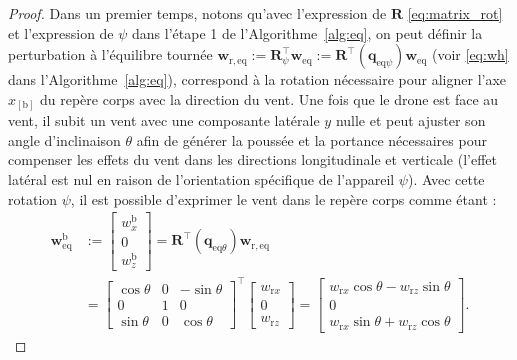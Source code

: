     \begin{proof}
        Dans un premier temps, notons qu'avec l'expression de $\boldsymbol{R}$ \eqref{eq:matrix_rot} et l'expression de  $\psi$ dans l'étape 1 de l'Algorithme~\ref{alg:eq}, on peut définir la perturbation à l'équilibre tournée $\boldsymbol{w}_{\mathrm{r,eq}} := \boldsymbol{R}^\top_{\psi} \boldsymbol{w}_{\mathrm{eq}} :=    \boldsymbol{R}^\top(\boldsymbol{q}_{\mathrm{eq}\psi})\boldsymbol{w}_{\mathrm{eq}}$ (voir \eqref{eq:wh} dans l'Algorithme~\ref{alg:eq}), correspond à la rotation nécessaire pour aligner l'axe  $x_{[\text{b}]}$ du repère corps avec la direction du vent. Une fois que le drone est face au vent, il subit un vent avec une composante latérale $y$ nulle et peut ajuster son angle d'inclinaison $\theta$ afin de générer la poussée et la portance nécessaires pour compenser les effets du vent dans les directions longitudinale et verticale (l'effet latéral est nul en raison de l'orientation spécifique de l'appareil $\psi$). Avec cette rotation $\psi$, il est possible d'exprimer le vent dans le repère corps comme étant :
            \begin{align}
            \label{eq:wb}
                \boldsymbol{w}^{\text{b}}_{\mathrm{eq}} &:= 
                \begin{bmatrix}
                    w_{x}^{\text{b}} \\ 0 \\ w_{z}^{\text{b}}
                \end{bmatrix} \!=\! 
                \boldsymbol{R}^\top(\boldsymbol{q}_{\text{eq}\theta}) \boldsymbol{w}_{\mathrm{r,eq}}  \\
                &=\!\! \begin{bmatrix}
                    \cos{\theta} & 0 & -\sin{\theta}\\
                        0 & 1 & 0\\
                    \sin{\theta} & 0 & \cos{\theta}
                \end{bmatrix}^\top \!\! \begin{bmatrix}
                    w_{\text{r}x}\\
                    0\\
                    w_{\text{r}z}
                \end{bmatrix}
                \!\!=\!\!\begin{bmatrix}
                    w_{\text{r}x} \cos{\theta} - w_{\text{r}z} \sin{\theta}\\
                    0\\
                    w_{\text{r}x} \sin{\theta} +  w_{\text{r}z} \cos{\theta}
                \end{bmatrix}.
            \nonumber
            \end{align}


\end{proof}
